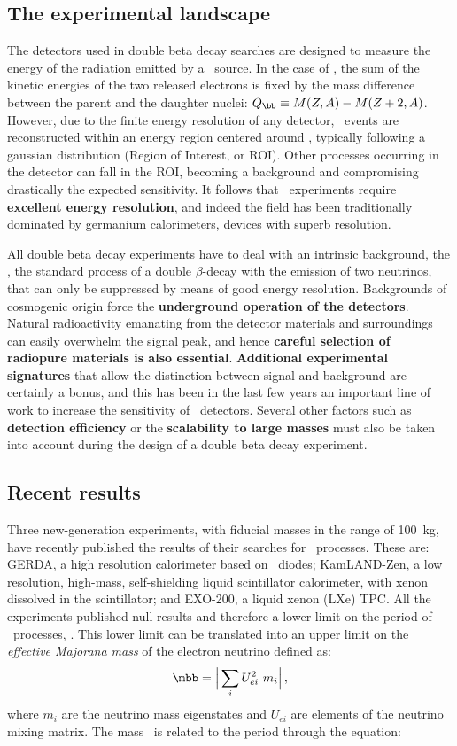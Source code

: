 \subsection{The experimental landscape}
The detectors used in double beta decay searches are designed to measure the energy of the radiation emitted by a \bb\ source. In the case of \bbonu, the sum of the kinetic energies of the two released electrons is fixed by the mass difference between the parent and the daughter nuclei: $Q_{\bb} \equiv M(Z,A)-M(Z+2,A)$. However, due to the finite energy resolution of any detector, \bbonu\ events are reconstructed within an energy region centered around \Qbb, typically following a gaussian distribution (Region of Interest, or ROI). Other processes occurring in the detector can fall in the ROI, becoming a background and compromising drastically the expected sensitivity. It follows that \bbonu\ experiments require {\bf excellent energy resolution}, and indeed the field has been traditionally dominated by germanium calorimeters, devices with superb resolution.

All double beta decay experiments have to deal with an intrinsic background, the \bbtnu, the standard process of a double $\beta$-decay with the emission of two neutrinos, that can only be suppressed by means of good energy resolution. Backgrounds of cosmogenic origin force the {\bf underground operation of the detectors}. Natural radioactivity emanating from the detector materials and surroundings can easily overwhelm the signal peak, and hence {\bf careful selection of radiopure materials is also essential}. {\bf Additional experimental signatures} that allow the distinction between signal and background are certainly a bonus, and this has been in the last few years an important line of work to increase the sensitivity of \bbonu\ detectors. Several other factors such as {\bf detection efficiency} or the {\bf scalability to large masses} must also be taken into account during the design of a double beta decay experiment.
 
 \subsection{Recent results}
 Three new-generation experiments, with fiducial masses in the range of 100~kg, have recently published the results of their searches for \bbonu\ processes. These are: GERDA, a high resolution calorimeter based on \GE\ diodes; KamLAND-Zen, a low resolution, high-mass, self-shielding liquid scintillator calorimeter, with xenon dissolved in the scintillator; and EXO-200, a liquid xenon (LXe) TPC. All the experiments published null results and therefore a lower limit on the period of \bbonu\ processes, \Tonu. This lower limit can be translated into an upper limit on the \emph{effective Majorana mass} of the electron neutrino defined as:
\begin{equation}
\mbb = \Big| \sum_{i} U^{2}_{ei} \ m_{i} \Big| \, ,
\end{equation}
%
where $m_{i}$ are the neutrino mass eigenstates and $U_{ei}$ are elements of the neutrino mixing matrix. The mass \mbb\ is related to the period through the equation:

